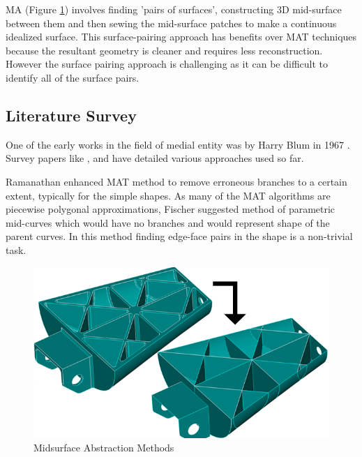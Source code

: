 MA (Figure \ref{Abstraction}) involves finding  'pairs of surfaces', constructing 3D mid-surface between them and then sewing the mid-surface patches to make a continuous idealized surface. This surface-pairing approach has benefits over MAT techniques because the resultant geometry is cleaner and requires less reconstruction. However the surface pairing approach is challenging as it can be difficult to identify all of the surface pairs.

\subsection{Literature Survey}

One of the early works in the field of medial entity was by Harry Blum in 1967 \citep{Harry1967}. Survey papers like \citep{Attali2004}, \citep{Lam1992} and \citep{Yogesh2010, YogeshCOEP2013} have detailed various approaches used so far. 


Ramanathan \citep{Ramanathan2004} enhanced MAT method to remove erroneous branches to a certain extent, typically for the simple shapes. As many of the MAT algorithms are piecewise polygonal approximations, Fischer \citep{Elber1999} suggested method of parametric mid-curves which would have no branches and would represent shape of the parent curves. In this method finding edge-face pairs in the shape is a non-trivial task. 

	
	
	\begin{figure}
	\centering
	\includegraphics[scale=0.4]{..//Common/images//Midsurface.png}
	\caption{Midsurface Abstraction Methods}
	\label{Abstraction}
	\vspace{-1cm}
	\end{figure}



